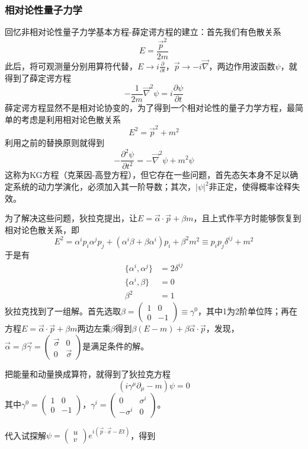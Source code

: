 \documentclass[a4paper,11pt]{ctexart}
\newcommand{\beq}{\begin{equation}}
\newcommand{\eeq}{\end{equation}}
\newcommand{\bea}{\begin{equation}\begin{aligned}}
\newcommand{\eea}{\end{aligned}\end{equation}}
\begin{document}
\subsubsection{相对论性量子力学}
回忆非相对论性量子力学基本方程-薛定谔方程的建立：首先我们有色散关系
\beq
E = \frac{\vec{p}^2}{2m}
\eeq
此后，将可观测量分别用算符代替，$E \to i \frac{\partial}{\partial t}$，$\vec{p} \to -i \vec{\nabla}$，两边作用波函数$\psi$，就得到了薛定谔方程
\beq
-\frac{1}{2m} \vec{\nabla}^2 \psi = i \frac{\partial \psi}{\partial t}
\eeq
薛定谔方程显然不是相对论协变的，为了得到一个相对论性的量子力学方程，最简单的考虑是利用相对论色散关系
\beq
E^2 = \vec{p}^2 + m^2
\eeq
利用之前的替换原则就得到
\beq
-\frac{\partial^2 \psi}{\partial t^2} = - \vec{\nabla}^2 \psi + m^2 \psi
\eeq
这称为KG方程（克莱因-高登方程），但它存在一些问题，首先态矢本身不足以确定系统的动力学演化，必须加入其一阶导数；其次，$|\psi|^2$非正定，使得概率诠释失效。
\par
为了解决这些问题，狄拉克提出，让$E = \vec{\alpha} \cdot \vec{p} + \beta m$，且上式作平方时能够恢复到相对论色散关系，即
\beq
E^2 = \alpha^i p_i \alpha^j p_j + (\alpha^i \beta + \beta \alpha^i)p_i + \beta^2 m^2 \equiv p_i p_j \delta^{ij} + m^2
\eeq
于是有
\bea
\{ \alpha^i,\alpha^j \} &= 2\delta^{ij} \\
\{\alpha^i,\beta\} &= 0 \\
\beta^2 &= 1
\eea
狄拉克找到了一组解。首先选取$\beta = \begin{pmatrix} 1 & 0 \\ 0 &-1 \end{pmatrix}\equiv \gamma^0$，其中1为2阶单位阵；再在方程$E = \vec{\alpha} \cdot \vec{p} + \beta m$两边左乘$\beta$得到$\beta (E-m) + \beta \vec{\alpha} \cdot \vec{p}$，发现，$\vec{\alpha} = \beta \vec{\gamma} = \begin{pmatrix} \vec{\sigma} & 0 \\ 0 & \vec{\sigma} \end{pmatrix}$是满足条件的解。
\par
把能量和动量换成算符，就得到了狄拉克方程
\beq
(i\gamma^\mu \partial_\mu - m) \psi = 0
\eeq
其中$\gamma^0 = \begin{pmatrix} 1 & 0 \\ 0 & -1 \end{pmatrix}$，$\gamma^i = \begin{pmatrix} 0 & \sigma^i \\ - \sigma^i & 0 \end{pmatrix}$。
\par
代入试探解$\psi = \begin{pmatrix} u \\ v \end{pmatrix} e^{i(\vec{p} \cdot \vec{x} - Et)}$，得到
\end{document}
